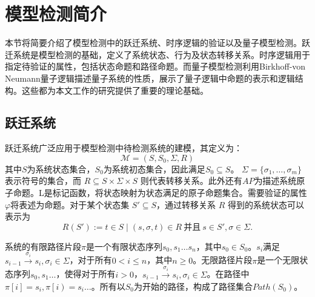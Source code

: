 \section{模型检测简介}
本节将简要介绍了模型检测中的跃迁系统、时序逻辑的验证以及量子模型检测。跃迁系统是模型检测的基础，定义了系统状态、行为及状态转移关系。时序逻辑用于指定待验证的属性，包括状态命题和路径命题。而量子模型检测利用Birkhoff-von Neumann量子逻辑描述量子系统的性质，展示了量子逻辑中命题的表示和逻辑结构。这些都为本文工作的研究提供了重要的理论基础。
\subsection{跃迁系统}
\label{sec-transition}
跃迁系统广泛应用于模型检测中待检测系统的建模，其定义为\citep{baier2008principles}：
\begin{equation}
\mathcal{M}=(S, S_0, \Sigma, R)
\end{equation}
其中\(S\)为系统状态集合，\(S_0\)为系统初态集合，因此满足\(S_0\subseteq S\)。 $\Sigma=\{\sigma_1,\ldots,\sigma_m\}$ 表示符号的集合，而 $R \subseteq S \times \Sigma \times S$ 则代表转移关系。此外还有\(AP\)为描述系统原子命题。L是标记函数，将状态映射为状态满足的原子命题集合。需要验证的属性\(\varphi\)将表述为命题。对于某个状态集 $S' \subseteq S$，通过转移关系 $R$ 得到的系统状态可以表示为
\begin{equation}\label{eq:image}
R(S') := { t\in S \mid (s, \sigma, t) \in R\ \text{并且}\ s \in S', \sigma \in \Sigma}.
\end{equation}


系统的有限路径片段\(\pi\)是一个有限状态序列\(s_0,s_1\ldots s_n\)，其中\(s_0\in S_0\)。\(s_i\)满足\(s_{i-1}\overset{\sigma_i}{\rightarrow}s_i,\sigma_i\in \Sigma\)，对于所有\(0<i\leq n\)，其中\(n\geq 0 \)。无限路径片段\(\pi\)是一个无限状态序列\(s_0,s_1\ldots\)，使得对于所有\(i>0\)，\(s_{i-1} \overset{\sigma_i}{\rightarrow}  s_i,\sigma_i\in \Sigma\)。在路径中\(\pi\left[i\right]=s_i,\pi\left[i\right)=s_i\ldots\)。所有以\(S_0\)为开始的路径，构成了路径集合\(Path\left(S_0\right)\)。

